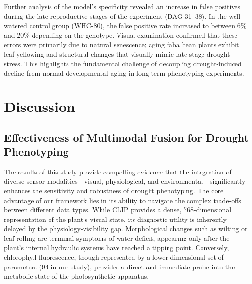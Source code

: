 \documentclass[a4paper,fleqn]{cas-dc}
\begin{document}
Further analysis of the model's specificity revealed an increase in false positives during the late reproductive stages of the experiment (DAG 31--38). In the well-watered control group (WHC-80), the false positive rate increased to between 6\% and 20\% depending on the genotype. Visual examination confirmed that these errors were primarily due to natural senescence; aging faba bean plants exhibit leaf yellowing and structural changes that visually mimic late-stage drought stress. This highlights the fundamental challenge of decoupling drought-induced decline from normal developmental aging in long-term phenotyping experiments.


\section{Discussion}\label{sec:discussion}

\subsection{Effectiveness of Multimodal Fusion for Drought Phenotyping}\label{sec:discussion:fusion}

The results of this study provide compelling evidence that the integration of diverse sensor modalities---visual, physiological, and environmental---significantly enhances the sensitivity and robustness of drought phenotyping. The core advantage of our framework lies in its ability to navigate the complex trade-offs between different data types. While CLIP provides a dense, 768-dimensional representation of the plant's visual state, its diagnostic utility is inherently delayed by the physiology-visibility gap. Morphological changes such as wilting or leaf rolling are terminal symptoms of water deficit, appearing only after the plant's internal hydraulic systems have reached a tipping point. Conversely, chlorophyll fluorescence, though represented by a lower-dimensional set of parameters (94 in our study), provides a direct and immediate probe into the metabolic state of the photosynthetic apparatus.
\end{document}
